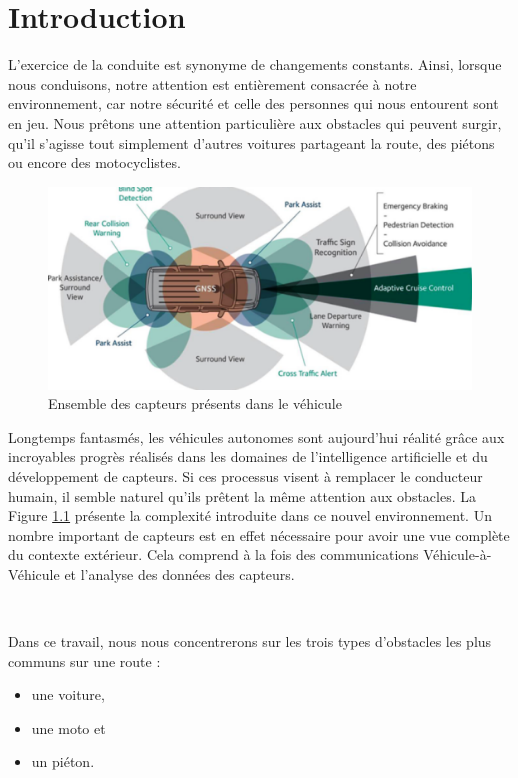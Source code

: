 \documentclass[a4paper]{report}
\begin{document}
\chapter{Introduction}

L'exercice de la conduite est synonyme de changements constants. Ainsi, lorsque nous conduisons, notre attention est entièrement consacrée à notre environnement, car notre sécurité et celle des personnes qui nous entourent sont en jeu. Nous prêtons une attention particulière aux obstacles qui peuvent surgir, qu'il s'agisse tout simplement d'autres voitures partageant la route, des piétons ou encore des motocyclistes.

\begin{figure}
\centering
\includegraphics[width=\textwidth]{img/sensors.png}
\caption{Ensemble des capteurs présents dans le véhicule\label{sensors}}
\end{figure}

Longtemps fantasmés, les véhicules autonomes sont aujourd'hui réalité grâce aux incroyables progrès réalisés dans les domaines de l'intelligence artificielle et du développement de capteurs. Si ces processus visent à remplacer le conducteur humain, il semble naturel qu'ils prêtent la même attention aux obstacles. La Figure \ref{sensors} présente la complexité introduite dans ce nouvel environnement. Un nombre important de capteurs est en effet nécessaire pour avoir une vue complète du contexte extérieur. Cela comprend à la fois des communications Véhicule-à-Véhicule et l'analyse des données des capteurs.

~\par

Dans ce travail, nous nous concentrerons sur les trois types d'obstacles les plus communs sur une route :
\begin{itemize}
\item une voiture,
\item une moto et
\item un piéton.
\end{itemize}
\end{document}
